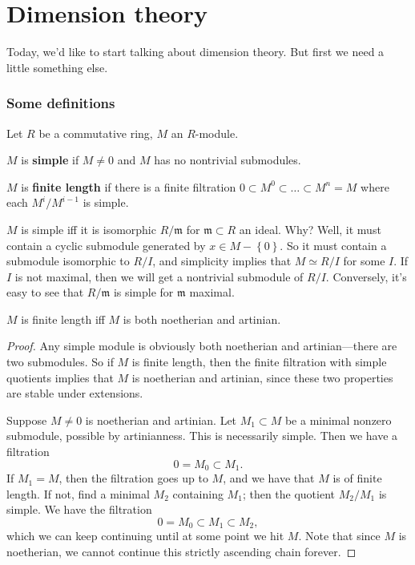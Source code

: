 \chapter{Dimension theory}


Today, we'd like to start talking about dimension theory. But first we need a
little something else.

\subsection{Some definitions}

Let $R$ be a commutative ring, $M$ an $R$-module. 

\begin{definition} 
$M$ is \textbf{simple} if $M \neq 0$ and $M$ has no nontrivial submodules.
\end{definition} 

\begin{definition} 
$M$ is \textbf{finite length} if there is a finite filtration $0 \subset M^0
\subset \dots \subset M^n = M$ where each $M^i/M^{i-1}$ is simple.
\end{definition} 

\begin{remark} 
$M$ is simple iff it is isomorphic $R/\mathfrak{m}$ for $\mathfrak{m} \subset
R$ an ideal. Why? Well, it must contain a cyclic submodule generated by $x \in
M - \left\{0\right\}$. So it must contain a submodule isomorphic to $R/I$, and
simplicity implies that $M \simeq R/I$ for some $I$. If $I$ is not maximal,
then we will get a nontrivial submodule of $R/I$. Conversely, it's easy to see
that $R/\mathfrak{m}$ is simple for $\mathfrak{m}$ maximal.
\end{remark} 

\begin{proposition} 
$M$ is finite length iff $M$ is both noetherian and artinian.
\end{proposition} 
\begin{proof} 
Any simple module is obviously both noetherian and artinian---there are two
submodules. So if $M$ is finite length, then the finite filtration with simple
quotients implies that $M$ is noetherian and artinian, since these two
properties are stable under extensions.

Suppose $M \neq 0$ is noetherian and artinian. Let $M_1 \subset M$ be a minimal
nonzero submodule, possible by artinianness. This is necessarily simple. Then we have a filtration
\[ 0 = M_0 \subset M_1.  \]
If $M_1 = M$, then the filtration goes up to $M$, and we have that $M$ is of
finite length. If not, find a minimal $M_2$ containing $M_1$; then the quotient
$M_2/M_1$ is simple. We have the filtration
\[ 0 = M_0 \subset M_1 \subset M_2,  \]
which we can keep continuing until at some point we hit $M$. Note that since
$M$ is noetherian, we cannot continue this strictly ascending chain forever. 
\end{proof} 

